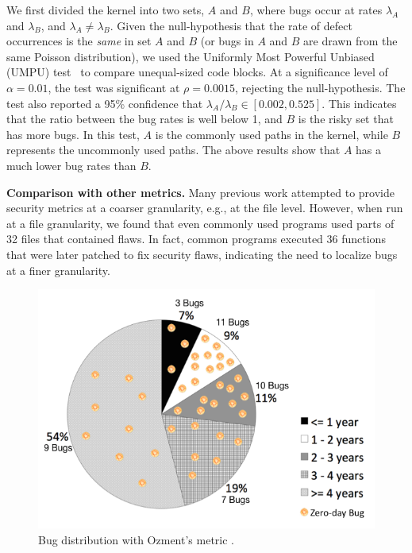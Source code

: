 We first divided the kernel into two sets,
$A$ and $B$, where bugs occur at rates $\lambda_A$ and
$\lambda_B$, and $\lambda_A \neq \lambda_B$. Given the null-hypothesis
that the rate of defect occurrences is the \textit{same} in set $A$ and $B$
(or bugs in $A$ and $B$ are drawn from the same Poisson distribution),
we used the Uniformly Most Powerful Unbiased (UMPU) test~\cite{shiue1982experiment}
to compare unequal-sized code blocks.
At a significance level of $\alpha=0.01$, the test was significant at
$\rho=0.0015$, rejecting the null-hypothesis.
The test also reported a 95\% confidence that $\lambda_A / \lambda_B
\in [0.002, 0.525]$. This indicates that the ratio between the bug rates is well
below 1, and $B$ is the risky set that has more bugs.
In this test, $A$ is the commonly used paths in the kernel, while $B$
represents the uncommonly used paths. The above results show that
$A$ has a much lower bug rates than $B$. 

\textbf{Comparison with other metrics.}
Many previous work attempted to provide security metrics at a coarser granularity, 
e.g., at the file level. However, when run at a file
granularity, we found that even commonly used programs used parts of
32 files that contained flaws.  In fact, common
programs executed 36 functions that were later patched to fix security
flaws, indicating the need to localize bugs at a finer granularity. 

\begin{figure}
\centering
\includegraphics[width=1.0\columnwidth]{diagram/metrics_age.png}
\caption{\small Bug distribution with Ozment's metric \cite{ozment2006milk}.}
\label{fig:metrics_age}
\end{figure}

